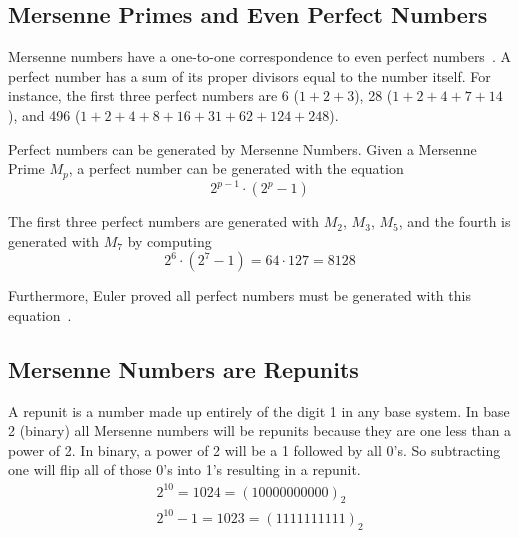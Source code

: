 \subsection{Mersenne Primes and Even Perfect Numbers}

Mersenne numbers have a one-to-one correspondence to even perfect numbers~\cite{perfect}. A perfect number has
a sum of its proper divisors equal to the number itself. For instance, the first three perfect numbers
are 6 ($1 + 2 + 3$), 28 ($1 + 2 + 4 + 7 + 14$), and 496 ($1 + 2 + 4 + 8 + 16 + 31 + 62 + 124 + 248$).

Perfect numbers can be generated by Mersenne Numbers. Given a Mersenne Prime $M_p$, a perfect number can be
generated with the equation
\begin{equation}
\label{eqn:perfno}
2^{p-1}\cdot(2^p-1)
\end{equation}

The first three perfect numbers are generated with $M_2$, $M_3$, $M_5$, and the fourth is generated with $M_7$ by computing 
\[ 2^6\cdot(2^7-1) = 64\cdot127 = 8128 \]

Furthermore, Euler proved all perfect numbers must be generated with this equation~\cite{perfect}.

\subsection{Mersenne Numbers are Repunits}
A repunit is a number made up entirely of the digit 1 in any base system.  In base 2 (binary) all Mersenne numbers will be repunits because they are one less than a power of 2.  In binary, a power of 2 will be a 1 followed by all 0's.  So subtracting one will flip all of those 0's into 1's resulting in a repunit.
\begin{align*}
2^{10} = 1024 = (10000000000)_2\\
2^{10} - 1 = 1023 = (1111111111)_2
\end{align*}
